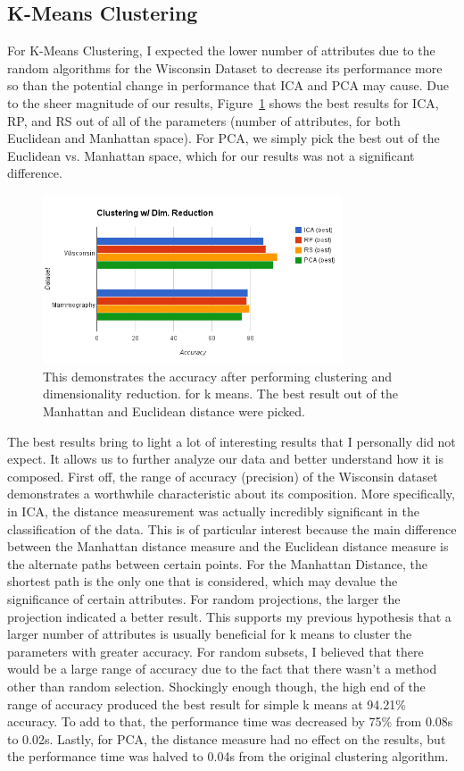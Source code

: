 \documentclass[annual]{acmsiggraph}
\begin{document}
\subsection{K-Means Clustering}
For K-Means Clustering, I expected the lower number of attributes due to the random algorithms for the Wisconsin Dataset to decrease its performance more so than the potential change in performance that ICA and PCA may cause. Due to the sheer magnitude of our results, Figure~\ref{fig:kmeanscluster} shows the best results for ICA, RP, and RS out of all of the parameters (number of attributes, for both Euclidean and Manhattan space). For PCA, we simply pick the best out of the Euclidean vs. Manhattan space, which for our results was not a significant difference.

\begin{figure}[ht]
  \centering
  \includegraphics[width=3.5in]{charts/clust_dim_red.png}
  \caption{This demonstrates the accuracy after performing clustering and dimensionality reduction. for k means. The best result out of the Manhattan and Euclidean distance were picked.}
  \label{fig:kmeanscluster}
\end{figure}

The best results bring to light a lot of interesting results that I personally did not expect. It allows us to further analyze our data and better understand how it is composed. First off, the range of accuracy (precision) of the Wisconsin dataset demonstrates a worthwhile characteristic about its composition. More specifically, in ICA, the distance measurement was actually incredibly significant in the classification of the data. This is of particular interest because the main difference between the Manhattan distance measure and the Euclidean distance measure is the alternate paths between certain points. For the Manhattan Distance, the shortest path is the only one that is considered, which may devalue the significance of certain attributes. For random projections, the larger the projection indicated a better result. This supports my previous hypothesis that a larger number of attributes is usually beneficial for k means to  cluster the parameters with greater accuracy. For random subsets, I believed that there would be a large range of accuracy due to the fact that there wasn't a method other than random selection. Shockingly enough though, the high end of the range of accuracy produced the best result for simple k means at 94.21\% accuracy. To add to that, the performance time was decreased by 75\% from 0.08s to 0.02s. Lastly, for PCA, the distance measure had no effect on the results, but the performance time was halved to 0.04s from the original clustering algorithm.
\end{document}
